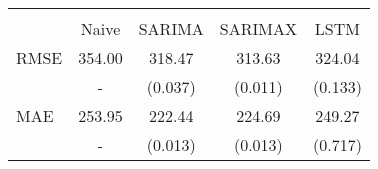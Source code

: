 \begin{tabular}{lcccc}
\hline\hline \\ [-1.8ex]
 & Naive & SARIMA & SARIMAX & LSTM \\ 
 \hline 
RMSE & 354.00 & 318.47 & 313.63 & 324.04 \\ 
 & - & (0.037) & (0.011) & (0.133) \\ 
MAE & 253.95 & 222.44 & 224.69 & 249.27 \\ 
 & - & (0.013) & (0.013) & (0.717) \\ 
\hline\hline
\end{tabular}
